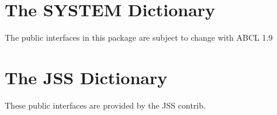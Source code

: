 \documentclass[10pt]{book}
\begin{document}


\chapter{The SYSTEM Dictionary}

The public interfaces in this package are subject to change with
\textsc{ABCL} 1.9



\chapter{The JSS Dictionary}

These public interfaces are provided by the JSS contrib.






\printindex
\end{document}
